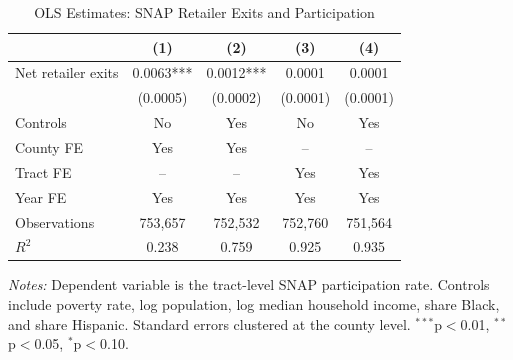 \begin{table}[t]
\centering
\caption{OLS Estimates: SNAP Retailer Exits and Participation}
\label{tab:ols}
\begin{threeparttable}
\begin{tabular}{lcccc}
\toprule
& (1) & (2) & (3) & (4) \\
\midrule
Net retailer exits & 0.0063*** & 0.0012*** & 0.0001 & 0.0001 \\
& (0.0005) & (0.0002) & (0.0001) & (0.0001) \\
\midrule
Controls & No & Yes & No & Yes \\
County FE & Yes & Yes & -- & -- \\
Tract FE & -- & -- & Yes & Yes \\
Year FE & Yes & Yes & Yes & Yes \\
\midrule
Observations & 753,657 & 752,532 & 752,760 & 751,564 \\
$R^2$ & 0.238 & 0.759 & 0.925 & 0.935 \\
\bottomrule
\end{tabular}
\begin{tablenotes}
\small
\item \textit{Notes:} Dependent variable is the tract-level SNAP participation rate. Controls include poverty rate, log population, log median household income, share Black, and share Hispanic. Standard errors clustered at the county level. $^{***}$p$<$0.01, $^{**}$p$<$0.05, $^{*}$p$<$0.10.
\end{tablenotes}
\end{threeparttable}
\end{table}
